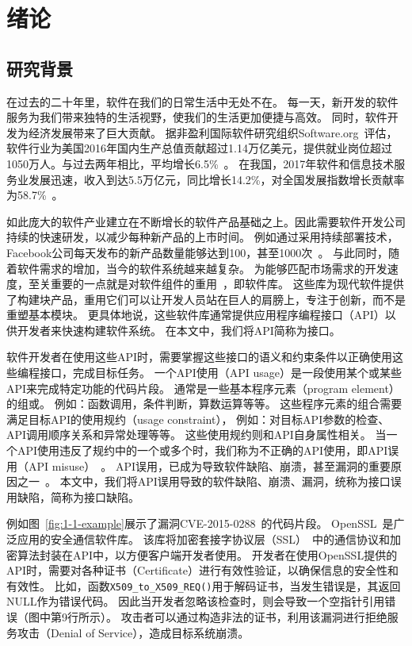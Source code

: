 \chapter{绪论}
\label{cha:intro}

\section{研究背景}
在过去的二十年里，软件在我们的日常生活中无处不在。
每一天，新开发的软件服务为我们带来独特的生活视野，使我们的生活更加便捷与高效。
同时，软件开发为经济发展带来了巨大贡献。
据非盈利国际软件研究组织Software.org~\cite{software-org}评估，软件行业为美国2016年国内生产总值贡献超过1.14万亿美元，提供就业岗位超过1050万人。与过去两年相比，平均增长6.5\%~\cite{2017-eco-report}。
在我国，2017年软件和信息技术服务业发展迅速，收入到达5.5万亿元，同比增长14.2\%，对全国发展指数增长贡献率为58.7\%~\cite{2018-china-report}。


如此庞大的软件产业建立在不断增长的软件产品基础之上。因此需要软件开发公司持续的快速研发，以减少每种新产品的上市时间。
例如通过采用持续部署技术，Facebook公司每天发布的新产品数量能够达到100，甚至1000次~\cite{16-icse-continuous}。
与此同时，随着软件需求的增加，当今的软件系统越来越复杂。
为能够匹配市场需求的开发速度，至关重要的一点就是对软件组件的重用~\cite{2011-icsr-reuse, 2013-cbse-reuse}，即软件库。
这些库为现代软件提供了构建块产品，重用它们可以让开发人员站在巨人的肩膀上，专注于创新，而不是重塑基本模块。
更具体地说，这些软件库通常提供应用程序编程接口（API）以供开发者来快速构建软件系统。
在本文中，我们将API简称为接口。


软件开发者在使用这些API时，需要掌握这些接口的语义和约束条件以正确使用这些编程接口，完成目标任务。
一个API使用（API usage）是一段使用某个或某些API来完成特定功能的代码片段。
通常是一些基本程序元素（program element）的组或。
例如：函数调用，条件判断，算数运算等等。
这些程序元素的组合需要满足目标API的使用规约（usage constraint），
例如：对目标API参数的检查、API调用顺序关系和异常处理等等。
这些使用规约则和API自身属性相关。
当一个API使用违反了规约中的一个或多个时，我们称为不正确的API使用，即API误用（API misuse）~\cite{16-msr-mubench}。
API误用，已成为导致软件缺陷、崩溃，甚至漏洞的重要原因之一~\cite{12-ccs-android,12-ccs-ssl,13-ccs-misuse,13-tosem-missing-call,14-apsys-case,15-icpc-api,16-ase-spec}。
本文中，我们将API误用导致的软件缺陷、崩溃、漏洞，统称为接口误用缺陷，简称为接口缺陷。


例如图~\ref{fig:1-1-example}展示了漏洞CVE-2015-0288~\cite{CVE-2015-0288}的代码片段。
OpenSSL~\cite{openssl}是广泛应用的安全通信软件库。
该库将加密套接字协议层（SSL）~\cite{ssl}中的通信协议和加密算法封装在API中，以方便客户端开发者使用。
开发者在使用OpenSSL提供的API时，需要对各种证书（Certificate）进行有效性验证，以确保信息的安全性和有效性。
比如，函数\texttt{X509\_to\_X509\_REQ()}用于解码证书，当发生错误是，其返回NULL作为错误代码。
因此当开发者忽略该检查时，则会导致一个空指针引用错误（图中第9行所示）。
攻击者可以通过构造非法的证书，利用该漏洞进行拒绝服务攻击（Denial of Service），造成目标系统崩溃。



